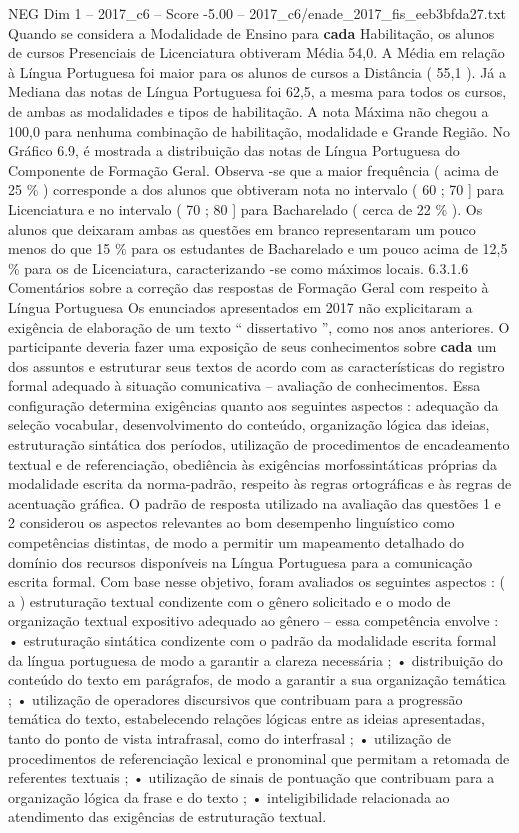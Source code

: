 \begin{textsample}{NEG Dim 1 – 2017\_c6 – Score -5.00 – 2017\_c6/enade\_2017\_fis\_eeb3bfda27.txt}
Quando se considera a Modalidade de Ensino para \textbf{cada} Habilitação, os alunos de cursos Presenciais de Licenciatura obtiveram Média 54,0.
A Média em relação à Língua Portuguesa foi maior para os alunos de cursos a Distância ( 55,1 ).
Já a Mediana das notas de Língua Portuguesa foi 62,5, a mesma para todos os cursos, de ambas as modalidades e tipos de habilitação.
A nota Máxima não chegou a 100,0 para nenhuma combinação de habilitação, modalidade e Grande Região.
No Gráfico 6.9, é mostrada a distribuição das notas de Língua Portuguesa do Componente de Formação Geral.
Observa -se que a maior frequência ( acima de 25 \% ) corresponde a dos alunos que obtiveram nota no intervalo ( 60 ; 70 ] para Licenciatura e no intervalo ( 70 ; 80 ] para Bacharelado ( cerca de 22 \% ).
Os alunos que deixaram ambas as questões em branco representaram um pouco menos do que 15 \% para os estudantes de Bacharelado e um pouco acima de 12,5 \% para os de Licenciatura, caracterizando -se como máximos locais. 6.3.1.6 Comentários sobre a correção das respostas de Formação Geral com respeito à Língua Portuguesa Os enunciados apresentados em 2017 não explicitaram a exigência de elaboração de um texto “ dissertativo ”, como nos anos anteriores.
O participante deveria fazer uma exposição de seus conhecimentos sobre \textbf{cada} um dos assuntos e estruturar seus textos de acordo com as características do registro formal adequado à situação comunicativa – avaliação de conhecimentos.
Essa configuração determina exigências quanto aos seguintes aspectos : adequação da seleção vocabular, desenvolvimento do conteúdo, organização lógica das ideias, estruturação sintática dos períodos, utilização de procedimentos de encadeamento textual e de referenciação, obediência às exigências morfossintáticas próprias da modalidade escrita da norma-padrão, respeito às regras ortográficas e às regras de acentuação gráfica.
O padrão de resposta utilizado na avaliação das questões 1 e 2 considerou os aspectos relevantes ao bom desempenho linguístico como competências distintas, de modo a permitir um mapeamento detalhado do domínio dos recursos disponíveis na Língua Portuguesa para a comunicação escrita formal.
Com base nesse objetivo, foram avaliados os seguintes aspectos : ( a ) estruturação textual condizente com o gênero solicitado e o modo de organização textual expositivo adequado ao gênero – essa competência envolve : • estruturação sintática condizente com o padrão da modalidade escrita formal da língua portuguesa de modo a garantir a clareza necessária ; • distribuição do conteúdo do texto em parágrafos, de modo a garantir a sua organização temática ; • utilização de operadores discursivos que contribuam para a progressão temática do texto, estabelecendo relações lógicas entre as ideias apresentadas, tanto do ponto de vista intrafrasal, como do interfrasal ; • utilização de procedimentos de referenciação lexical e pronominal que permitam a retomada de referentes textuais ; • utilização de sinais de pontuação que contribuam para a organização lógica da frase e do texto ; • inteligibilidade relacionada ao atendimento das exigências de estruturação textual.

\end{textsample}
